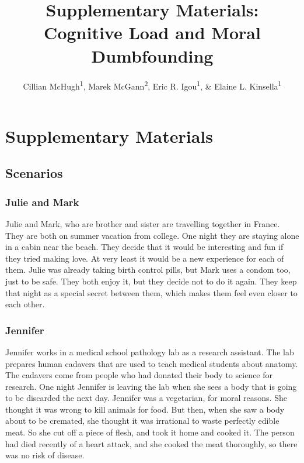 \documentclass[
  man,floatsintext]{apa6}
\title{Supplementary Materials: Cognitive Load and Moral Dumbfounding}
\author{Cillian McHugh\textsuperscript{1}, Marek McGann\textsuperscript{2}, Eric R. Igou\textsuperscript{1}, \& Elaine L. Kinsella\textsuperscript{1}}
\date{}
\affiliation{\vspace{0.5cm}\textsuperscript{1} Department of Psychology, University of Limerick\\\textsuperscript{2} Department of Psychology, Mary Immaculate College, University of Limerick}
\begin{document}
\maketitle

\hypertarget{supplementary-materials}{%
\section{Supplementary Materials}\label{supplementary-materials}}

\hypertarget{scenarios}{%
\subsection{Scenarios}\label{scenarios}}

\hypertarget{julie-and-mark}{%
\subsubsection{Julie and Mark}\label{julie-and-mark}}

Julie and Mark, who are brother and sister are travelling together in France. They are both on summer vacation from college. One night they are staying alone in a cabin near the beach. They decide that it would be interesting and fun if they tried making love. At very least it would be a new experience for each of them. Julie was already taking birth control pills, but Mark uses a condom too, just to be safe. They both enjoy it, but they decide not to do it again. They keep that night as a special secret between them, which makes them feel even closer to each other.

\hypertarget{jennifer}{%
\subsubsection{Jennifer}\label{jennifer}}

Jennifer works in a medical school pathology lab as a research assistant. The lab prepares human cadavers that are used to teach medical students about anatomy. The cadavers come from people who had donated their body to science for research. One night Jennifer is leaving the lab when she sees a body that is going to be discarded the next day. Jennifer was a vegetarian, for moral reasons. She thought it was wrong to kill animals for food. But then, when she saw a body about to be cremated, she thought it was irrational to waste perfectly edible meat. So she cut off a piece of flesh, and took it home and cooked it. The person had died recently of a heart attack, and she cooked the meat thoroughly, so there was no risk of disease.
\end{document}
